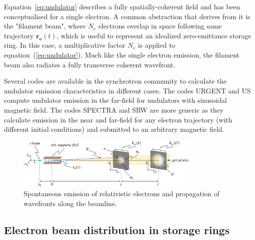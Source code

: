\documentclass{iucr}              %
\begin{document}
Equation~\ref{eq:undulator} describes a fully spatially-coherent field and has been conceptualised for a single electron. A common abstraction that derives from it is the "filament beam", where $N_e$ electrons overlap in space following same trajectory $\textbf{r}_{\textbf{e}}(t)$, which is useful to  represent an idealized zero-emittance storage ring. In this case, a multiplicative factor $N_e$ is applied to equation~(\ref{eq:undulator}). Much like the single electron emission, the filament beam also radiates a fully transverse coherent wavefront.

Several codes are available in the synchrotron community to calculate the undulator emission characteristics in different cases. The codes URGENT \cite{codeURGENT} and US \cite{codeUS} compute undulator emission in the far-field for undulators with sinusoidal magnetic field. The codes SPECTRA \cite{Tanaka2001} and SRW \cite{codeSRW} are more generic as they calculate emission in the near and far-field for any electron trajectory (with different initial conditions) and submitted to an arbitrary magnetic field.

\onecolumn
\begin{figure}\label{fig:coordinates}
    \centering
    \includegraphics[width=0.79\textwidth]{figures/coordinates.pdf}
    \caption{Spontaneous emission of relativistic electrons and propagation of wavefronts along the beamline.}
\end{figure}
\newpage
\twocolumn

\subsection{Electron beam distribution in storage rings}
\label{sec:electronbeam}
\end{document}
